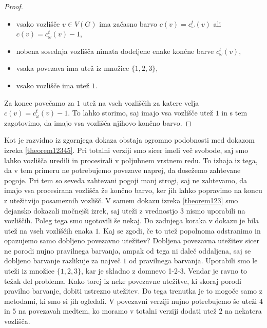 \documentclass[12pt,a4paper,twoside]{article}
\theoremstyle{definition} %
\theoremstyle{plain} %
\numberwithin{equation}{section}  %
\begin{document}
\begin{proof}
\begin{itemize}
\item vsako vozlišče $v \in V(G)$ ima začasno barvo $c(v) = c_{\omega}^t(v)$ ali $c(v) = c_{\omega}^t(v) - 1$,
\item nobena sosednja vozlišča nimata dodeljene enake končne barve $c_{\omega}^t(v)$,
\item vsaka povezava ima utež iz množice $\{1,2,3\}$,
\item vsako vozlišče ima utež $1$.
\end{itemize}
Za konec povečamo za $1$ utež na vseh vozliščih za katere velja $c(v) = c_{\omega}^t(v) - 1$. To lahko storimo, saj imajo vsa vozlišče utež $1$ in s tem zagotovimo, da imajo vsa vozlišča njihovo končno barvo.
\end{proof}
Kot je razvidno iz zgornjega dokaza obstaja ogromno podobnosti med dokazom izreka \ref{theorem12345}. Pri totalni verziji smo sicer imeli več svobode, saj smo lahko vozlišča uredili in procesirali v poljubnem vrstnem redu. To izhaja iz tega, da v tem primeru ne potrebujemo povezave naprej, da dosežemo zahtevane pogoje. Pri tem so seveda zahtevani pogoji manj strogi, saj ne zahtevamo, da imajo vsa procesirana vozlišča že končno barvo, ker jih lahko popravimo na koncu z utežitvijo posameznih vozlišč. V samem dokazu izreka \ref{theorem123} smo dejansko dokazali močnejši izrek, saj uteži z vrednostjo $3$ nismo uporabili na vozliščih. Poleg tega smo ugotovili še nekaj. Do zadnjega koraka v dokazu je bila utež na vseh vozliščih enaka $1$. Kaj se zgodi, če to utež popolnoma odstranimo in opazujemo samo dobljeno povezavno utežitev? Dobljena povezavna utežitev sicer ne porodi nujno pravilnega barvanja, ampak od tega ni daleč oddaljena, saj se dobljeno barvanje razlikuje za največ $1$ od pravilnega barvanja. Uporabili smo le uteži iz množice $\{1,2,3\}$, kar je skladno z domnevo 1-2-3. Vendar je ravno to težak del problema. Kako torej iz neke povezavne utežitve, ki skoraj porodi pravilno barvanje, dobiti ustrezno utežitev. Do tega trenutka je to mogoče samo z metodami, ki smo si jih ogledali. V povezavni verziji nujno potrebujemo še uteži $4$ in $5$ na povezavah medtem, ko moramo v totalni verziji dodati utež $2$ na nekatera vozlišča.
\end{document}
